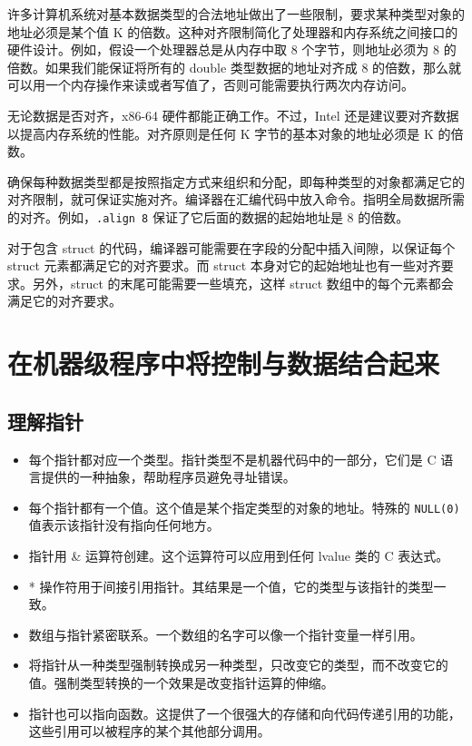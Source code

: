 许多计算机系统对基本数据类型的合法地址做出了一些限制，要求某种类型对象的地址必须是某个值 K 的倍数。这种对齐限制简化了处理器和内存系统之间接口的硬件设计。例如，假设一个处理器总是从内存中取 8 个字节，则地址必须为 8 的倍数。如果我们能保证将所有的 double 类型数据的地址对齐成 8 的倍数，那么就可以用一个内存操作来读或者写值了，否则可能需要执行两次内存访问。

无论数据是否对齐，x86-64 硬件都能正确工作。不过，Intel 还是建议要对齐数据以提高内存系统的性能。对齐原则是任何 K 字节的基本对象的地址必须是 K 的倍数。

确保每种数据类型都是按照指定方式来组织和分配，即每种类型的对象都满足它的对齐限制，就可保证实施对齐。编译器在汇编代码中放入命令。指明全局数据所需的对齐。例如，\verb|.align 8| 保证了它后面的数据的起始地址是 8 的倍数。

对于包含 struct 的代码，编译器可能需要在字段的分配中插入间隙，以保证每个 struct 元素都满足它的对齐要求。而 struct 本身对它的起始地址也有一些对齐要求。另外，struct 的末尾可能需要一些填充，这样 struct 数组中的每个元素都会满足它的对齐要求。

\section{在机器级程序中将控制与数据结合起来}

\subsection{理解指针}

\begin{itemize}
    \item 每个指针都对应一个类型。指针类型不是机器代码中的一部分，它们是 C 语言提供的一种抽象，帮助程序员避免寻址错误。
    \item 每个指针都有一个值。这个值是某个指定类型的对象的地址。特殊的 \verb|NULL(0)| 值表示该指针没有指向任何地方。
    \item 指针用 \& 运算符创建。这个运算符可以应用到任何 lvalue 类的 C 表达式。
    \item * 操作符用于间接引用指针。其结果是一个值，它的类型与该指针的类型一致。
    \item 数组与指针紧密联系。一个数组的名字可以像一个指针变量一样引用。
    \item 将指针从一种类型强制转换成另一种类型，只改变它的类型，而不改变它的值。强制类型转换的一个效果是改变指针运算的伸缩。
    \item 指针也可以指向函数。这提供了一个很强大的存储和向代码传递引用的功能，这些引用可以被程序的某个其他部分调用。
\end{itemize}

